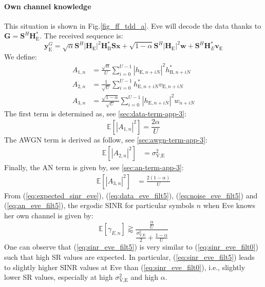 \documentclass[journal,comsoc]{IEEEtran}
\newcommand{\module}[1]{\left|#1\right|}
\newcommand{\EX}[1]{\mathbb{E} \left[#1\right]}%
\newcommand{\HE}{\textbf{H}_{\text{E}}}
\newcommand{\HB}{\textbf{H}_{\text{B}}}
\newcommand{\ve}{\textbf{v}_{\text{E}}}
\newcommand{\spread}{\textbf{S}}
\newcommand{\w}{\textbf{w}}
\begin{document}

\paragraph{Own channel knowledge}
\label{sec:own-channel-knowledge}
This situation is shown in Fig.\ref{fig_ff_tdd_a}. Eve will decode the data thanks to $\textbf{G} = \spread^H \HE^*$. The received sequence is:
\begin{equation}
	\textbf{y}_{\text{E}}^G = \sqrt{\alpha} \spread^H \module{\HE}^2 \HB^* \spread\textbf{x} +  \sqrt{1-\alpha} \spread^H \module{\HE}^2 \w  +  \spread^H  \textbf{H}^*_E  \ve
	\label{eq:rx_eve_filt5}
\end{equation}
We define: 
\begin{equation}
\begin{split}
A_{1,n} &= \frac{\sqrt{\alpha}}{U}\sum_{i=0}^{U-1}  \left|h_{\text{E}, n + iN}\right|^2  h_{\text{B}, n + iN}^* \\
A_{2,n} &= \frac{1}{\sqrt{U}}\sum_{i=0}^{U-1} h^*_{\text{E}, n + iN}  v_{\text{E}, n + iN}\\
A_{3,n} &=\frac{ \sqrt{1-\alpha}  }{\sqrt{U}}\sum_{i=0}^{U-1}   \left|h_{\text{E}, n + iN}\right|^2 w_{n + iN}
\end{split}
\end{equation}
The first term is determined as, see \ref{sec:data-term-app-3}:
\begin{equation}
\EX{|A_{1,n}|^2} = \frac{2\alpha}{U}
\label{eq:data_eve_filt5}
\end{equation}
The AWGN term is derived as follow, see \ref{sec:awgn-term-app-3}:
\begin{equation}
\begin{split}
\EX{|A_{2,n}|^2} &= \sigma^2_{\text{V,E}}
\end{split}
\label{eq:noise_eve_filt5}
\end{equation}
Finally, the AN term is given by, see \ref{sec:an-term-app-3}:
\begin{equation}
\begin{split}
\EX{|A_{3,n}|^2}  &=  \frac{2(1-\alpha)}{U}
\end{split}
\label{eq:an_eve_filt5}
\end{equation}
From (\ref{eq:expected_sinr_eve}), (\ref{eq:data_eve_filt5}), (\ref{eq:noise_eve_filt5}) and (\ref{eq:an_eve_filt5}),  the ergodic SINR for particular symbols $n$ when Eve knows her own channel is given by:
\begin{equation}
\EX{\gamma_{E,n}} \gtrapprox \frac{\frac{\alpha }{U}}{\frac{\sigma^2_{\text{V,E}}}{2} + \frac{1-\alpha}{U}}
\label{eq:sinr_eve_filt5}
\end{equation}
One can observe that (\ref{eq:sinr_eve_filt5}) is very similar to (\ref{eq:sinr_eve_filt0}) such that high SR values are expected. In particular, (\ref{eq:sinr_eve_filt5}) leads to slightly higher SINR values at Eve than (\ref{eq:sinr_eve_filt0}), i.e., slightly lower SR values, especially at high $\sigma^2_{\text{V,E}}$ and high $\alpha$. 
\end{document}
